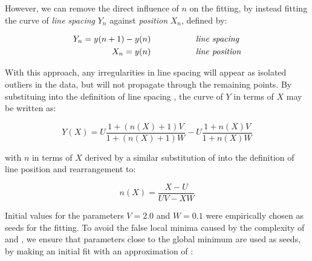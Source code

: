 {%
However, we can remove the direct influence of $n$ on the fitting, by instead fitting
the curve of {\em line spacing} $Y_n$ against {\em position} $X_n$, defined by:


\begin{eqnarray}
Y_n = y(n+1)-y(n) & \mbox{~~~~~~~~~~~~~~~ \it line spacing} \label{linespacingsdefneqn} \\
X_n = y(n) & \mbox{~~~~~~~~~~~~~~~ \it line position} \label{linepositiondefneqn}
\end{eqnarray}

With this approach, any irregularities in line spacing will appear as isolated
outliers in the data, but will not propagate through the remaining points. %
By substituing 
into the definition of line spacing , the curve of
$Y$ in terms of $X$ may be written as: 
}

\begin{equation}
Y(X) = U \frac{1+(n(X)+1)V}{1+(n(X)+1)W} - U \frac{1+n(X)V}{1+n(X)W}
\label{fittingeqn}
\end{equation}

{\parindent 0mm
with $n$ in terms of $X$ derived by a similar substitution of  into the definition of line position  and rearrangement to:
}

\begin{equation}
n(X) = \frac{X-U}{UV-XW}
\label{nfromxeqn}
\end{equation}

Initial values for the parameters $V=2.0$ and $W=0.1$ were empirically chosen as 
seeds for the fitting.
To avoid the false local minima caused by the complexity of  and ,
we ensure that parameters close to the global minimum are used as seeds,
by making an initial fit with an approximation of :

